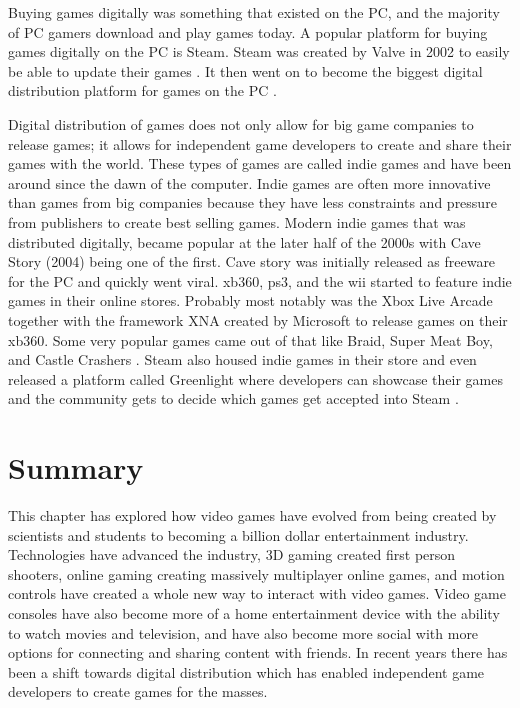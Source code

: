 Buying games digitally was something that existed on the PC, and the majority of PC gamers download and play games today. A popular platform for buying games digitally on the PC is Steam. Steam was created by Valve in 2002 to easily be able to update their games \cite{2012eurogamer}. It then went on to become the biggest digital distribution platform for games on the PC \cite{2009gamasutra}.

Digital distribution of games does not only allow for big game companies to release games; it allows for independent game developers to create and share their games with the world. These types of games are called indie games and have been around since the dawn of the computer. Indie games are often more innovative than games from big companies because they have less constraints and pressure from publishers to create best selling games. Modern indie games that was distributed digitally, became popular at the later half of the 2000s with Cave Story (2004) being one of the first. Cave story was initially released as freeware for the PC and quickly went viral. \gls{xb360}, \gls{ps3}, and the \gls{wii} started to feature indie games in their online stores. Probably most notably was the Xbox Live Arcade together with the framework XNA created by Microsoft to release games on their \gls{xb360}. Some very popular games came out of that like Braid, Super Meat Boy, and Castle Crashers \cite{2015eurogamer}. Steam also housed indie games in their store and even released a platform called Greenlight where developers can showcase their games and the community gets to decide which games get accepted into Steam \cite{2015watlington}.


\section{Summary}
This chapter has explored how video games have evolved from being created by scientists and students to becoming a billion dollar entertainment industry. Technologies have advanced the industry, 3D gaming created first person shooters, online gaming creating massively multiplayer online games, and motion controls have created a whole new way to interact with video games. Video game consoles have also become more of a home entertainment device with the ability to watch movies and television, and have also become more social with more options for connecting and sharing content with friends. In recent years there has been a shift towards digital distribution which has enabled independent game developers to create games for the masses.

